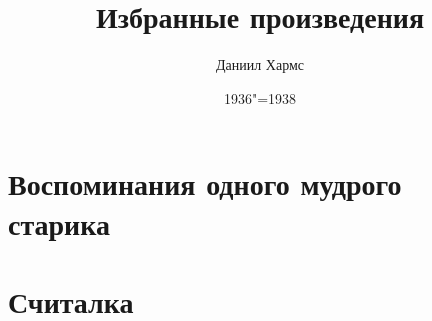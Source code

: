 \documentclass[a4paper,12pt]{book}
\title{Избранные произведения}
\author{Даниил Хармс}
\date{1936"=1938}
\begin{document}
\maketitle

\chapter{Воспоминания одного мудрого старика}


\chapter{Считалка}

\end{document}

